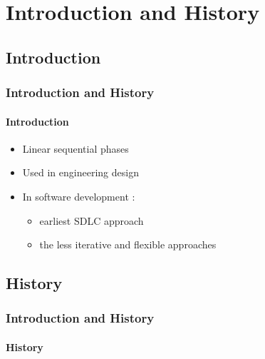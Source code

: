 \documentclass[10pt]{beamer}
\begin{document}
\begin{frame}
    \tableofcontents
\end{frame}



\section{Introduction and History}
\subsection{Introduction}
\begin{frame}
\frametitle{Introduction and History}
\framesubtitle{Introduction}
\begin{itemize}
    \item Linear sequential phases
    \item Used in engineering design
    \item In software development : 
    \begin{itemize}
        \item earliest SDLC approach
        \item the less iterative and flexible approaches
    \end{itemize}    
\end{itemize}
\end{frame}

\subsection{History}
\begin{frame}
\frametitle{Introduction and History}
\framesubtitle{History}
\startchronology
[startyear=1950,stopyear=1990]
\stopchronology
    
\end{frame}


\end{document}
